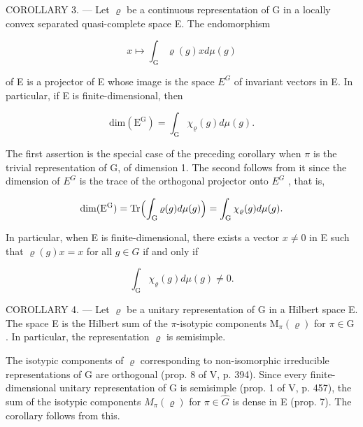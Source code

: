 COROLLARY 3. --- Let \(\varrho\) be a continuous representation of G in a locally convex separated quasi-complete space E. The endomorphism

\[
x \mapsto \int_ {\mathrm{G}} \varrho (g) x d \mu (g)
\]

of E is a projector of E whose image is the space \(E^{G}\) of invariant vectors in E. In particular, if E is finite-dimensional, then

\[
\mathrm{dim} (\mathrm{E} ^ {\mathrm{G}}) = \int_ {\mathrm{G}} \chi_ {\varrho} (g) d \mu (g).
\]

The first assertion is the special case of the preceding corollary when \(\pi\) is the trivial representation of G, of dimension 1. The second follows from it since the dimension of \(E^{G}\) is the trace of the orthogonal projector onto \(E^{G}\) , that is,

\[
\mathrm{dim} (\mathrm{E} ^ {\mathrm{G}}) = \mathrm{Tr} \Bigl (\int_ {\mathrm{G}} \varrho (g) d \mu (g) \Bigr) = \int_ {\mathrm{G}} \chi_ {\varrho} (g) d \mu (g).
\]

In particular, when E is finite-dimensional, there exists a vector \(x \neq 0\) in E such that \(\varrho(g)x = x\) for all \(g \in G\) if and only if

\[
\int_ {\mathrm{G}} \chi_ {\varrho} (g) d \mu (g) \neq 0.
\]

COROLLARY 4. --- Let \(\varrho\) be a unitary representation of G in a Hilbert space E. The space E is the Hilbert sum of the \(\pi\)-isotypic components \(\mathrm{M}_{\pi}(\varrho)\) for \(\pi \in \widehat{\mathrm{G}}\) . In particular, the representation \(\varrho\) is semisimple.

The isotypic components of \(\varrho\) corresponding to non-isomorphic irreducible representations of G are orthogonal (prop. 8 of V, p. 394). Since every finite-dimensional unitary representation of G is semisimple (prop. 1 of V, p. 457), the sum of the isotypic components \(M_{\pi}(\varrho)\) for \(\pi \in \widehat{G}\) is dense in E (prop. 7). The corollary follows from this.